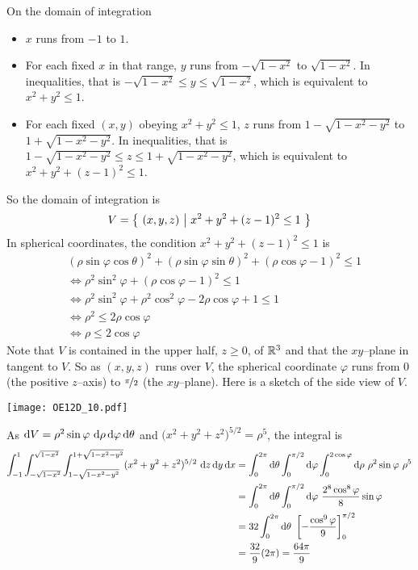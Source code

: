 \begin{solution}
On the domain of integration 
\begin{itemize}
\item
$x$ runs from $-1$ to $1$. 
\item
For each fixed $x$ in that range, $y$ runs from $-\sqrt{1-x^2}$ to
$\sqrt{1-x^2}$. In inequalities, that is $-\sqrt{1-x^2}\le y\le \sqrt{1-x^2}$,
which is equivalent to $x^2+y^2\le 1$.
\item
For each fixed $(x,y)$ obeying $x^2+y^2\le 1$, $z$ runs from
$1-\sqrt{1-x^2-y^2}$ to $1+\sqrt{1-x^2-y^2}$.
In inequalities, that is $1-\sqrt{1-x^2-y^2}\le z\le 1+\sqrt{1-x^2-y^2}$,
which is equivalent to $x^2+y^2+(z-1)^2\le 1$. 
\end{itemize}
So the domain of integration is
\begin{equation*}
V = \big\{ \ (x,y,z)\ \big|\ x^2+y^2+(z-1)^2\le 1\ \big\}
\end{equation*}
In spherical coordinates, the  condition $x^2+y^2+(z-1)^2\le 1$ is
\begin{align*}
&(\rho\sin\varphi\cos\theta)^2
+(\rho\sin\varphi\sin\theta)^2
+(\rho\cos\varphi-1)^2\le 1 \\
&\iff
\rho^2\sin^2\varphi + (\rho\cos\varphi-1)^2\le 1 \\
&\iff 
\rho^2\sin^2\varphi + \rho^2\cos^2\varphi -2 \rho\cos\varphi +1 \le 1 \\
&\iff
\rho^2\le 2\rho\cos\varphi \\
&\iff
\rho\le 2\cos\varphi
\end{align*}
Note that $V$ is contained in the upper half, $z\ge 0$, of $\mathbb{R}^3$
and that the $xy$--plane in tangent to $V$. So as $(x,y,z)$ runs over $V$,
the spherical coordinate $\varphi$ runs from $0$ (the positive $z$--axis) 
to $\nicefrac{\pi}{2}$ (the $xy$--plane). Here is a sketch of the side view
of $V$.

\begin{center}
     \texttt{[image: OE12D\_10.pdf]}
\end{center}

 
As $\dee{V} = \rho^2\sin\varphi\ \dee{\rho}\,\dee{\varphi}\,\dee{\theta}$
and $\big(x^2+y^2+z^2\big)^{5/2}=\rho^5$, the integral is
\begin{align*}
\int_{-1}^1 \int_{-\sqrt{1-x^2}}^{\sqrt{1-x^2}}  
           \int_{1-\sqrt{1-x^2-y^2}}^{1+\sqrt{1-x^2-y^2}}
   (x^2+y^2+z^2)^{5/2}  \ \dee{z}\,\dee{y}\,\dee{x}
&=\int_0^{2\pi}\dee{\theta}\int_0^{\pi/2}\dee{\varphi}
       \int_0^{2\cos\varphi}\dee{\rho}\ \rho^2\sin\varphi
        \ \rho^5 \\
&=\int_0^{2\pi}\dee{\theta}\int_0^{\pi/2}\dee{\varphi}
       \ \frac{2^8\cos^8\varphi}{8}\sin\varphi \\
&=32\int_0^{2\pi}\dee{\theta}\ \left[-\frac{\cos^9\varphi}{9}\right]_0^{\pi/2}
  \\
&=\frac{32}{9}(2\pi)
=\frac{64\pi}{9}
\end{align*}
\end{solution}


